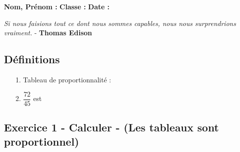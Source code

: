 



\textbf{Nom, Prénom :} \hspace{8cm} \textbf{Classe :} \hspace{3cm} \textbf{Date :}\\
\vspace{-0.8cm}
\begin{center}
  \textit{Si nous faisions tout ce dont nous sommes capables, nous nous surprendrions vraiment.}  - \textbf{Thomas Edison}
\end{center}
\vspace{-0.8cm}

\subsection*{Définitions}
  \begin{enumerate}
    \item[1.] Tableau de proportionnalité : \dotfill \\
    \Pointilles[2]
    \item[2.] $\dfrac{72}{45}$ est \dotfill \\
    \Pointilles[1]
  \end{enumerate}

\subsection*{Exercice 1 - Calculer - (Les tableaux sont proportionnel)}

